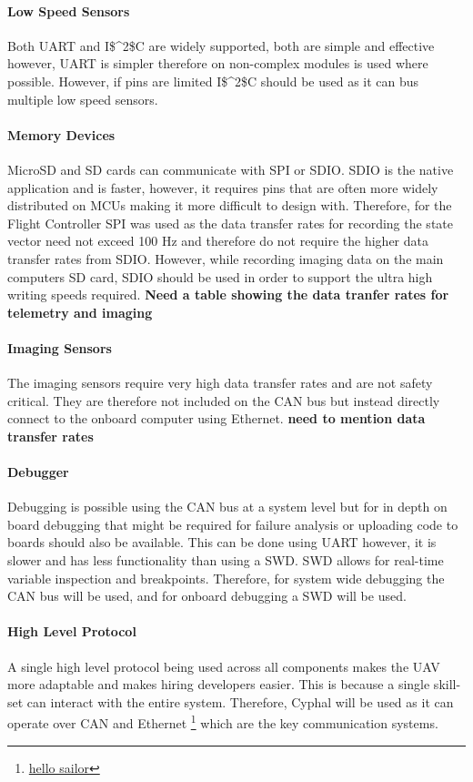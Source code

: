 \paragraph{Low Speed Sensors}
Both \gls{UART} and \gls{I$^2$C} are widely supported, both are simple and effective however, \gls{UART} is simpler therefore on non-complex modules is used where possible. However, if pins are limited \gls{I$^2$C} should be used as it can bus multiple low speed sensors.
\paragraph{Memory Devices}
MicroSD and SD cards can communicate with \gls{SPI} or \gls{SDIO}. \gls{SDIO} is the native application and is faster, however, it requires pins that are often more widely distributed on \gls{MCU}s making it more difficult to design with. Therefore, for the Flight Controller \gls{SPI} was used as the data transfer rates for recording the state vector need not exceed 100 Hz and therefore do not require the higher data transfer rates from \gls{SDIO}. However, while recording imaging data on the main computers SD card, \gls{SDIO} should be used in order to support the ultra high writing speeds required. \textbf{Need a table showing the data tranfer rates for telemetry and imaging}
\paragraph{Imaging Sensors}
The imaging sensors require very high data transfer rates and are not safety critical. They are therefore not included on the \gls{CAN} bus but instead directly connect to the onboard computer using Ethernet. \textbf{need to mention data transfer rates}
\paragraph{Debugger}
Debugging is possible using the \gls{CAN} bus at a system level but for in depth on board debugging that might be required for failure analysis or uploading code to boards should also be available. This can be done using \gls{UART} however, it is slower and has less functionality than using a \gls{SWD}. \gls{SWD} allows for real-time variable inspection and breakpoints. Therefore, for system wide debugging the \gls{CAN} bus will be used, and for onboard debugging a \gls{SWD} will be used.
\paragraph{High Level Protocol}
A single high level protocol being used across all components makes the \gls{UAV} more adaptable and makes hiring developers easier. This is because a single skill-set can interact with the entire system. Therefore, Cyphal will be used as it can operate over \gls{CAN} and Ethernet \footnote{\url{hello sailor}} which are the key communication systems. 
